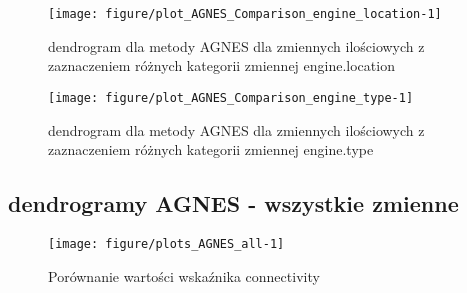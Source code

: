 \documentclass[12pt, a4paper]{article}\usepackage[]{graphicx}\usepackage[]{xcolor}
\makeatletter
\def\maxwidth{ %
  \ifdim\Gin@nat@width>\linewidth
    \linewidth
  \else
    \Gin@nat@width
  \fi
}
\newenvironment{knitrout}{}{} %
\makeatother
\begin{document}
\begin{knitrout}
\color{fgcolor}\begin{figure}[H]

{\centering \texttt{[image: figure/plot\_AGNES\_Comparison\_engine\_location-1]} 

}

\caption[dendrogram dla metody AGNES dla zmiennych ilościowych z zaznaczeniem różnych kategorii zmiennej engine.location]{dendrogram dla metody AGNES dla zmiennych ilościowych z zaznaczeniem różnych kategorii zmiennej engine.location}\label{fig:plot_AGNES_Comparison_engine.location}
\end{figure}

\end{knitrout}

\begin{knitrout}
\color{fgcolor}\begin{figure}[H]

{\centering \texttt{[image: figure/plot\_AGNES\_Comparison\_engine\_type-1]} 

}

\caption[dendrogram dla metody AGNES dla zmiennych ilościowych z zaznaczeniem różnych kategorii zmiennej engine.type]{dendrogram dla metody AGNES dla zmiennych ilościowych z zaznaczeniem różnych kategorii zmiennej engine.type}\label{fig:plot_AGNES_Comparison_engine.type}
\end{figure}

\end{knitrout}

\subsection{dendrogramy AGNES - wszystkie zmienne}

\begin{knitrout}
\color{fgcolor}\begin{figure}[H]

{\centering \texttt{[image: figure/plots\_AGNES\_all-1]} 

}

\caption[Porównanie wartości wskaźnika connectivity]{Porównanie wartości wskaźnika connectivity}\label{fig:plots_AGNES_all}
\end{figure}

\end{knitrout}
\end{document}

